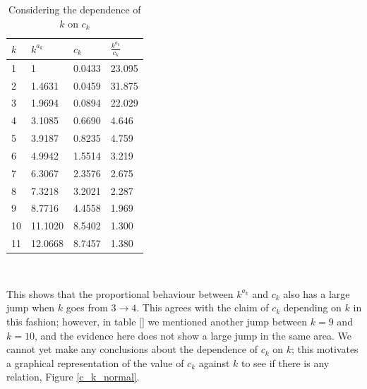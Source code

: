 \documentclass{report}
\begin{document}
\begin{table}
\caption{Considering the dependence of $k$ on $c_{k}$} \label{normal_dependentk}
\begin{center}
\begin{tabular}{| l | l l l |} 
\toprule
$k$ &  $k^{a_{k}}$ & $c_{k}$ & $\frac{k^{a_{k}}}{c_{k}}$ \\
\midrule[1pt]
1  & 1 & 0.0433 & 23.095 \\
2  & 1.4631 & 0.0459 & 31.875 \\
3  & 1.9694 & 0.0894 & 22.029 \\
4  & 3.1085 & 0.6690 & 4.646 \\
5  & 3.9187 & 0.8235 & 4.759 \\
6  & 4.9942 & 1.5514 & 3.219 \\
7  & 6.3067 & 2.3576 & 2.675 \\
8  & 7.3218 & 3.2021 & 2.287 \\
9  & 8.7716 & 4.4558 & 1.969 \\
10 & 11.1020 & 8.5402 & 1.300 \\
11 & 12.0668 & 8.7457 & 1.380 \\
\hline
\end{tabular}
\\[10pt]
\end{center}
\end{table}

This shows that the proportional behaviour between $k^{a_{k}}$ and $c_{k}$ also has a large jump when $k$ goes from $3 \to 4$. This agrees with the claim of $c_{k}$ depending on $k$ in this fashion; however, in table \ref{} we mentioned another jump between $k=9$ and $k=10$, and the evidence here does not show a large jump in the same area. We cannot yet make any conclusions about the dependence of $c_{k}$ on $k$; this motivates a graphical representation of the value of $c_{k}$ against $k$ to see if there is any relation, Figure \ref{c_k_normal}.
\end{document}
